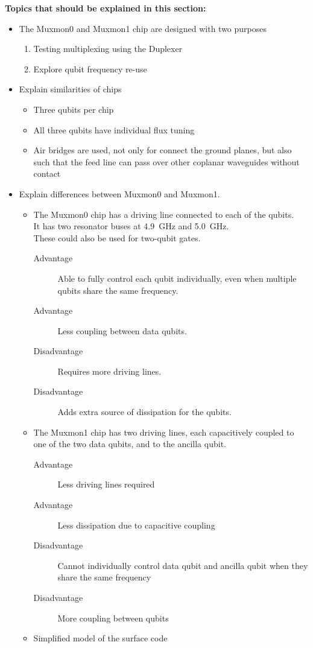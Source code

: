\documentclass[12pt]{report}
\begin{document}
    \textbf{Topics that should be explained in this section:}
    \begin{itemize}
      \item The Muxmon0 and Muxmon1 chip are designed with two purposes
      \begin{enumerate}
        \item Testing multiplexing using the Duplexer
        \item Explore qubit frequency re-use
      \end{enumerate}

      \item Explain similarities of chips
      \begin{itemize}
        \item Three qubits per chip
        \item All three qubits have individual flux tuning
        \item Air bridges are used, not only for connect the ground planes, but also such that the feed line can pass over other coplanar waveguides without contact \\
      \end{itemize}

      \item Explain differences between Muxmon0 and Muxmon1.
      \begin{itemize}
        \item The Muxmon0 chip has a driving line connected to each of the qubits. \\
            It has two resonator buses at \SI{4.9}{\giga \hertz} and \SI{5.0}{\giga \hertz}. \\
            These could also be used for two-qubit gates.
        \begin{description}
          \item[Advantage] Able to fully control each qubit individually, even when multiple qubits share the same frequency.
          \item[Advantage] Less coupling between data qubits.
          \item[Disadvantage] Requires more driving lines.
          \item[Disadvantage] Adds extra source of dissipation for the qubits.
        \end{description}
        \item The Muxmon1 chip has two driving lines, each capacitively coupled to one of the two data qubits, and to the ancilla qubit.
        \begin{description}
          \item[Advantage] Less driving lines required
          \item[Advantage] Less dissipation due to capacitive coupling
          \item[Disadvantage] Cannot individually control data qubit and ancilla qubit when they share the same frequency
          \item[Disadvantage] More coupling between qubits
        \end{description}
        \item Simplified model of the surface code
      \end{itemize}


\end{itemize}
\end{document}
